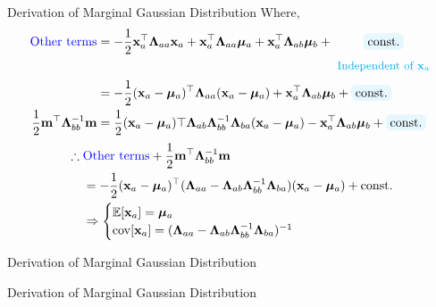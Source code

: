 \documentclass[10pt]{beamer}
\newcommand{\bluetext}[1]{\textcolor{blue}{#1}}
\newcommand{\highlight}[2][yellow]{\tikz[baseline=(x.base)]{\node[rectangle,rounded corners,fill=#1!10](x){$#2$};}}
\newcommand{\highlightcap}[3][yellow]{\tikz[baseline=(x.base)]{\node[rectangle,rounded corners,fill=#1!10](x){$#2$} node[below of=x, node distance=2em, color=#1]{#3};}}
\begin{document}
    \begin{frame}{Derivation of Marginal Gaussian Distribution}
        Where,
        \begin{align*}
            \mbox{\bluetext{Other terms}} &= -\frac{1}{2}\mathbf x_a^\top\bm\Lambda_{aa}\mathbf x_a + \mathbf x_a^\top\bm\Lambda_{aa}\bm\mu_a
                + \mathbf x_a^\top\bm\Lambda_{ab}\bm\mu_b + \highlightcap[cyan]{\mathrm{const.}}{\small Independent of $\mathbf x_a$} \\
                &= -\frac{1}{2}(\mathbf x_a - \bm\mu_a)^\top\bm\Lambda_{aa}(\mathbf x_a - \bm\mu_a) + \mathbf x_a^\top\bm\Lambda_{ab}\bm\mu_b + \highlight[cyan]{\mathrm{const.}} \\
            \frac{1}{2}\mathbf m^\top\bm\Lambda_{bb}^{-1}\mathbf m &= 
                \frac{1}{2}(\mathbf x_a - \bm\mu_a)\top\bm\Lambda_{ab}\bm\Lambda_{bb}^{-1}\bm\Lambda_{ba}(\mathbf x_a - \bm\mu_a)
                - \mathbf x_a^\top\bm\Lambda_{ab}\bm\mu_b + \highlight[cyan]{\mathrm{const.}}
        \end{align*}
        \begin{align*}
            \therefore\; &\mbox{\bluetext{Other terms}} + \frac{1}{2}\mathbf m^\top\bm\Lambda_{bb}^{-1}\mathbf m \\
            &= -\frac{1}{2}(\mathbf x_a - \bm\mu_a)^\top(\bm\Lambda_{aa} - \bm\Lambda_{ab}\bm\Lambda_{bb}^{-1}\bm\Lambda_{ba})(\mathbf x_a - \bm\mu_a) + \mathrm{const.} \\
            &\Rightarrow
            \begin{cases}
                \mathbb E[\mathbf x_a] = \bm\mu_a \\
                \mathrm{cov}[\mathbf x_a] = (\bm\Lambda_{aa} - \bm\Lambda_{ab}\bm\Lambda_{bb}^{-1}\bm\Lambda_{ba})^{-1}
            \end{cases}
        \end{align*}
    \end{frame}
    
    \begin{frame}{Derivation of Marginal Gaussian Distribution}
    
    \end{frame}
    
    \begin{frame}{Derivation of Marginal Gaussian Distribution}
    
    \end{frame}
    
\end{document}
